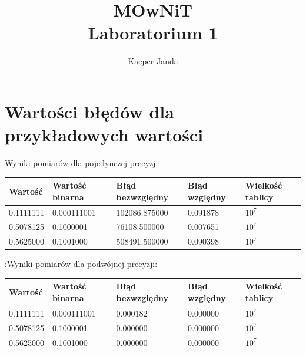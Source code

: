\documentclass[11pt, a4paper]{article}
\begin{document}
\title{MOwNiT\\Laboratorium 1}
\author{Kacper Janda}
\maketitle

\section{Wartości błędów dla przykładowych wartości}
 

Wyniki pomiarów dla pojedynczej precyzji:
\begin{center}
    \begin{tabular}{| l | l | l | l | l |}
    \hline
    Wartość & Wartość binarna & Błąd bezwzględny & Błąd względny & Wielkość tablicy\\ \hline
    0.1111111 & 0.000111001 & 102086.875000 & 0.091878 & \begin{math} 10^7 \end{math}\\ \hline
    0.5078125 & 0.1000001 & 76108.500000 & 0.007651 & \begin{math} 10^7 \end{math}\\ \hline
    0.5625000 & 0.1001000 & 508491.500000 & 0.090398 & \begin{math} 10^7 \end{math}\\
    \hline
    \end{tabular}
\end{center}
\vphantom\vphantom\vphantom :Wyniki pomiarów dla podwójnej precyzji:
\begin{center}
    \begin{tabular}{| l | l | l | l | l |}
    \hline
    Wartość & Wartość binarna & Błąd bezwzględny & Błąd względny & Wielkość tablicy\\ \hline
    0.1111111 & 0.000111001 & 0.000182 & 0.000000 & \begin{math} 10^7 \end{math}\\ \hline
    0.5078125 & 0.1000001 & 0.000000 & 0.000000 & \begin{math} 10^7 \end{math} \\ \hline
    0.5625000 & 0.1001000 & 0.000000 & 0.000000 & \begin{math} 10^7 \end{math}\\
    \hline
    \end{tabular}
\end{center}
\end{document}

